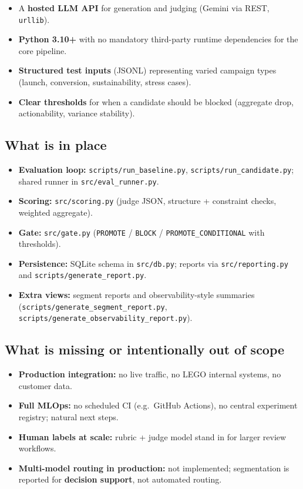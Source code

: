 \documentclass[11pt,a4paper]{article}
\begin{document}
\begin{itemize}
  \item A \textbf{hosted LLM API} for generation and judging (Gemini via REST, \texttt{urllib}).
  \item \textbf{Python 3.10+} with no mandatory third-party runtime dependencies for the core pipeline.
  \item \textbf{Structured test inputs} (JSONL) representing varied campaign types (launch, conversion, sustainability, stress cases).
  \item \textbf{Clear thresholds} for when a candidate should be blocked (aggregate drop, actionability, variance stability).
\end{itemize}

\subsection{What is in place}

\begin{itemize}
  \item \textbf{Evaluation loop:} \texttt{scripts/run\_baseline.py}, \texttt{scripts/run\_candidate.py}; shared runner in \texttt{src/eval\_runner.py}.
  \item \textbf{Scoring:} \texttt{src/scoring.py} (judge JSON, structure + constraint checks, weighted aggregate).
  \item \textbf{Gate:} \texttt{src/gate.py} (\texttt{PROMOTE} / \texttt{BLOCK} / \texttt{PROMOTE\_CONDITIONAL} with thresholds).
  \item \textbf{Persistence:} SQLite schema in \texttt{src/db.py}; reports via \texttt{src/reporting.py} and \texttt{scripts/generate\_report.py}.
  \item \textbf{Extra views:} segment reports and observability-style summaries (\texttt{scripts/generate\_segment\_report.py}, \texttt{scripts/generate\_observability\_report.py}).
\end{itemize}

\subsection{What is missing or intentionally out of scope}

\begin{itemize}
  \item \textbf{Production integration:} no live traffic, no LEGO internal systems, no customer data.
  \item \textbf{Full MLOps:} no scheduled CI (e.g.\ GitHub Actions), no central experiment registry; natural next steps.
  \item \textbf{Human labels at scale:} rubric + judge model stand in for larger review workflows.
  \item \textbf{Multi-model routing in production:} not implemented; segmentation is reported for \textbf{decision support}, not automated routing.
\end{itemize}
\end{document}
